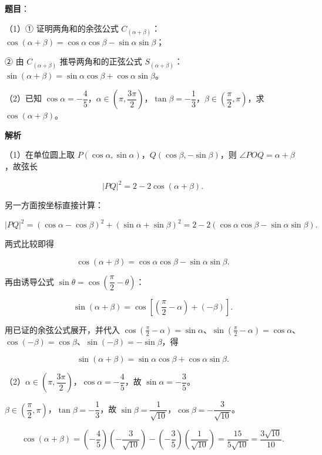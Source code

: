 \begin{answer}

\textbf{题目}：

（1）① 证明两角和的余弦公式 $C_{(\alpha+\beta)}$：$\cos(\alpha+\beta)=\cos\alpha\cos\beta-\sin\alpha\sin\beta$；

② 由 $C_{(\alpha+\beta)}$ 推导两角和的正弦公式 $S_{(\alpha+\beta)}$：$\sin(\alpha+\beta)=\sin\alpha\cos\beta+\cos\alpha\sin\beta$。

（2）已知 $\cos\alpha=-\dfrac45$，$\alpha\in\left(\pi,\dfrac{3\pi}2\right)$，$\tan\beta=-\dfrac13$，$\beta\in\left(\dfrac\pi2,\pi\right)$，求 $\cos(\alpha+\beta)$。

\textbf{解析}

（1）在单位圆上取 $P(\cos\alpha,\sin\alpha)$，$Q(\cos\beta,-\sin\beta)$，则 $\angle POQ=\alpha+\beta$，故弦长

\nopagebreak[4]
\[|PQ|^2=2-2\cos(\alpha+\beta).\]

另一方面按坐标直接计算：

\nopagebreak[4]
\[|PQ|^2=(\cos\alpha-\cos\beta)^2+(\sin\alpha+\sin\beta)^2
=2-2(\cos\alpha\cos\beta-\sin\alpha\sin\beta).\]

两式比较即得

\nopagebreak[4]
\[\cos(\alpha+\beta)=\cos\alpha\cos\beta-\sin\alpha\sin\beta.\]

再由诱导公式 $\sin\theta=\cos\left(\dfrac\pi2-\theta\right)$：

\nopagebreak[4]
\[\sin(\alpha+\beta)=\cos\left[\left(\frac\pi2-\alpha\right)+(-\beta)\right].\]

用已证的余弦公式展开，并代入 $\cos\left(\frac\pi2-\alpha\right)=\sin\alpha$、$\sin\left(\frac\pi2-\alpha\right)=\cos\alpha$、$\cos(-\beta)=\cos\beta$、$\sin(-\beta)=-\sin\beta$，得

\nopagebreak[4]
\[\sin(\alpha+\beta)=\sin\alpha\cos\beta+\cos\alpha\sin\beta.\]

（2）$\alpha\in\left(\pi,\dfrac{3\pi}2\right)$，$\cos\alpha=-\dfrac45$，故 $\sin\alpha=-\dfrac35$。

$\beta\in\left(\dfrac\pi2,\pi\right)$，$\tan\beta=-\dfrac13$，故 $\sin\beta=\dfrac1{\sqrt{10}}$，$\cos\beta=-\dfrac3{\sqrt{10}}$。

\nopagebreak[4]
\[\cos(\alpha+\beta)
=\left(-\frac45\right)\left(-\frac3{\sqrt{10}}\right)
-\left(-\frac35\right)\left(\frac1{\sqrt{10}}\right)
=\frac{15}{5\sqrt{10}}=\frac{3\sqrt{10}}{10}.\]


\end{answer}
